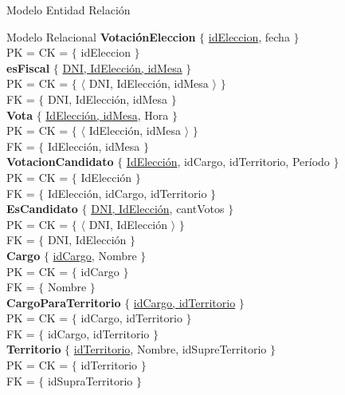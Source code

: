 \begin{section}{Modelo Entidad Relaci\'on}
\begin{subsection}{Modelo Relacional}
\textbf{Votaci\'onEleccion} $ \lbrace $ \underline{idEleccion}, fecha $ \rbrace $ \\
PK = CK = $ \lbrace $ idEleccion $ \rbrace $ \\

\textbf{esFiscal} $ \lbrace $ \underline{DNI, IdElecci\'on, idMesa} $ \rbrace $ \\
PK = CK = $ \lbrace $ $ \langle $ DNI, IdElecci\'on, idMesa $ \rangle $ $ \rbrace $ \\
FK = $ \lbrace $ DNI, IdElecci\'on, idMesa $ \rbrace $\\

\textbf{Vota} $ \lbrace $ \underline{IdElecci\'on, idMesa}, Hora $ \rbrace $ \\
PK = CK = $ \lbrace $ $ \langle $ IdElecci\'on, idMesa $ \rangle $ $ \rbrace $ \\
FK = $ \lbrace $ IdElecci\'on, idMesa $ \rbrace $\\

\textbf{VotacionCandidato} $ \lbrace $ \underline{IdElecci\'on}, idCargo, idTerritorio, Per\'iodo $ \rbrace $ \\
PK = CK = $ \lbrace $ IdElecci\'on $ \rbrace $ \\
FK = $ \lbrace $ IdElecci\'on, idCargo, idTerritorio $ \rbrace $\\

\textbf{EsCandidato} $ \lbrace $ \underline{DNI, IdElecci\'on}, cantVotos $ \rbrace $ \\
PK = CK = $ \lbrace $ $ \langle $ DNI, IdElecci\'on $ \rangle $ $ \rbrace $ \\
FK = $ \lbrace $ DNI, IdElecci\'on $ \rbrace $\\

\textbf{Cargo} $ \lbrace $ \underline{idCargo}, Nombre $ \rbrace $ \\
PK = CK = $ \lbrace $ idCargo $ \rbrace $ \\
FK = $ \lbrace $ Nombre $ \rbrace $\\

\textbf{CargoParaTerritorio} $ \lbrace $ \underline{idCargo, idTerritorio} $ \rbrace $ \\
PK = CK = $ \lbrace $ idCargo, idTerritorio $ \rbrace $ \\
FK = $ \lbrace $ idCargo, idTerritorio $ \rbrace $\\

\textbf{Territorio} $ \lbrace $ \underline{idTerritorio}, Nombre, idSupreTerritorio $ \rbrace $ \\
PK = CK = $ \lbrace $ idTerritorio $ \rbrace $ \\
FK = $ \lbrace $ idSupraTerritorio $ \rbrace $\\


\end{subsection}
\end{section}
